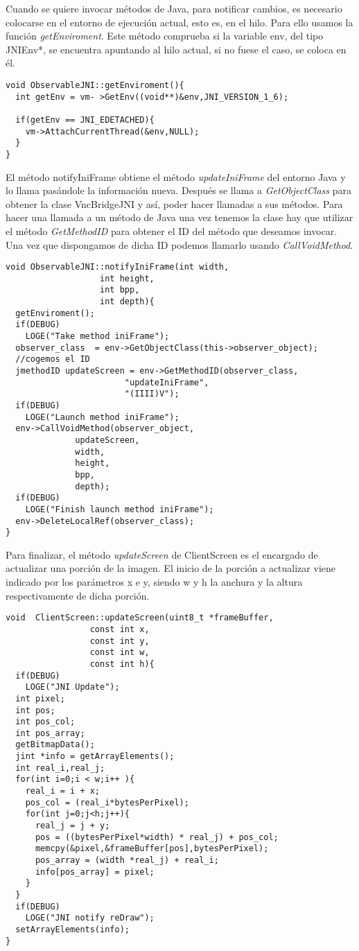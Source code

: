 Cuando se quiere invocar métodos de Java, para notificar cambios, es necesario colocarse en el entorno de ejecución actual, esto es, en el hilo. Para ello usamos la función \emph{getEnviroment}. Este método comprueba si la variable env, del tipo JNIEnv*, se encuentra apuntando al hilo actual, si no fuese el caso, se coloca en él.

\begin{lstlisting}
void ObservableJNI::getEnviroment(){
  int getEnv = vm- >GetEnv((void**)&env,JNI_VERSION_1_6);

  if(getEnv == JNI_EDETACHED){
    vm->AttachCurrentThread(&env,NULL);
  }
}
\end{lstlisting}

El método notifyIniFrame obtiene el método \emph{updateIniFrame} del entorno Java y lo llama pasándole la información nueva. Después se llama a \emph{GetObjectClass} para obtener la clase VncBridgeJNI y así, poder hacer llamadas a sus métodos. Para hacer una llamada a un método de Java una vez tenemos la clase hay que utilizar el método \emph{GetMethodID} para obtener el ID del método que deseamos invocar. Una vez que dispongamos de dicha ID podemos llamarlo usando \emph{CallVoidMethod}.
\begin{lstlisting}
void ObservableJNI::notifyIniFrame(int width,
				   int height,
				   int bpp,
				   int depth){
  getEnviroment();
  if(DEBUG)
    LOGE("Take method iniFrame");
  observer_class  = env->GetObjectClass(this->observer_object);
  //cogemos el ID
  jmethodID updateScreen = env->GetMethodID(observer_class,
					    "updateIniFrame",
					    "(IIII)V");
  if(DEBUG)
    LOGE("Launch method iniFrame");
  env->CallVoidMethod(observer_object,
		      updateScreen,
		      width,
		      height,
		      bpp,
		      depth);
  if(DEBUG)
    LOGE("Finish launch method iniFrame");
  env->DeleteLocalRef(observer_class);
}
\end{lstlisting}

Para finalizar, el método \emph{updateScreen} de ClientScreen es el encargado de actualizar una porción de la imagen. El inicio de la porción a actualizar viene indicado por los parámetros x e y, siendo w y h la anchura y la altura respectivamente de dicha porción.
\begin{lstlisting}
void  ClientScreen::updateScreen(uint8_t *frameBuffer,
				 const int x,
				 const int y,
				 const int w,
				 const int h){
  if(DEBUG)
    LOGE("JNI Update");
  int pixel;
  int pos;
  int pos_col;
  int pos_array;
  getBitmapData();
  jint *info = getArrayElements();
  int real_i,real_j;
  for(int i=0;i < w;i++ ){
    real_i = i + x;
    pos_col = (real_i*bytesPerPixel);
    for(int j=0;j<h;j++){
      real_j = j + y;
      pos = ((bytesPerPixel*width) * real_j) + pos_col;
      memcpy(&pixel,&frameBuffer[pos],bytesPerPixel);
      pos_array = (width *real_j) + real_i;
      info[pos_array] = pixel;
    }
  }
  if(DEBUG)
    LOGE("JNI notify reDraw");
  setArrayElements(info);
}
\end{lstlisting}

